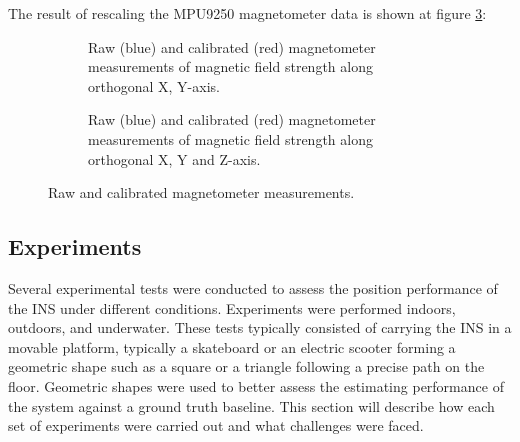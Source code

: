 The result of rescaling the MPU9250 magnetometer data is shown at figure \ref{fig:mag_calibration_output}:

\begin{figure}[H]
  \centering
  \begin{subfigure}{0.49\textwidth}
    \centering
    \resizebox{1\linewidth}{!}{}
    \caption{Raw (blue) and calibrated (red) magnetometer measurements of magnetic field strength along orthogonal X, Y-axis.}
    \label{fig:magnetometer_calibrated2D}
  \end{subfigure}
  \begin{subfigure}{0.49\textwidth}
    \centering
    \resizebox{1\linewidth}{!}{}
    \caption{Raw (blue) and calibrated (red) magnetometer measurements of magnetic field strength along orthogonal X, Y and Z-axis.}
    \label{fig:magnetometer_calibrated3D}
  \end{subfigure}
  \caption{Raw and calibrated magnetometer measurements.}
  \label{fig:mag_calibration_output}
\end{figure}

\newpage




\subsection{Experiments}
\label{sub:experiments}

Several experimental tests were conducted to assess the position performance of the INS under different conditions. Experiments were performed indoors, outdoors, and underwater. These tests typically consisted of carrying the INS in a movable platform, typically a skateboard or an electric scooter forming a geometric shape such as a square or a triangle following a precise path on the floor. Geometric shapes were used to better assess the estimating performance of the system against a ground truth baseline. This section will describe how each set of experiments were carried out and what challenges were faced.


